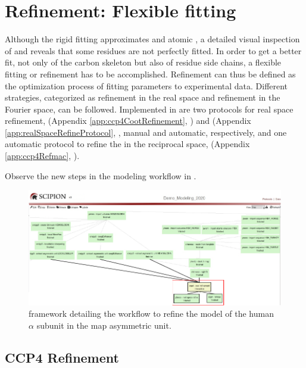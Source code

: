 \section{Refinement: Flexible fitting}
\label{refinementFlexibleFitting}
Although the rigid fitting approximates  and atomic , a detailed visual inspection of  and  reveals that some residues are not perfectly fitted. In order to get a better fit, not only of the carbon skeleton but also of residue side chains, a flexible fitting or refinement has to be accomplished. Refinement can thus be defined as the optimization process of fitting  parameters to experimental data. Different strategies, categorized as refinement in the real space and refinement in the Fourier space, can be followed. Implemented in \scipion are two protocols for real space refinement,  (Appendix \ref{app:ccp4CootRefinement}, \citep{emsley2010}) and  (Appendix \ref{app:realSpaceRefineProtocol}, \citep{afonine2018a}, manual and automatic, respectively, and one automatic protocol to refine the  in the reciprocal space,  (Appendix \ref{app:ccp4Refmac}, \citep{vagin2004}). 

Observe the new steps in the modeling \scipion workflow in .

 \begin{figure}[H]
  \centering 
  \captionsetup{width=.9\linewidth} 
  \includegraphics[width=1\textwidth]{Images/Fig68}
  \caption{\scipion framework detailing the workflow to refine the model of the human  $\alpha$ subunit in the map asymmetric unit.}
  \label{fig:scipion_workflow_flexiblefit}
  \end{figure}

 \subsection*{CCP4 \coot Refinement}
 
